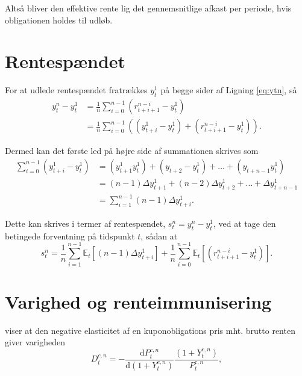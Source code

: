 \documentclass[
  a4paper,
  oneside]{memoir}
\begin{document}
Altså bliver den effektive rente lig det gennemsnitlige afkast per periode, hvis obligationen holdes til udløb.

\hypertarget{rentespuxe6ndet}{%
\section{Rentespændet}\label{rentespuxe6ndet}}

For at udlede rentespændet fratrækkes \(y_t^1\) på begge sider af Ligning \eqref{eq:ytn}, så
\begin{align*}
y_t^n-y_t^1&=\frac{1}{n} \sum_{i=0}^{n-1} \left(r_{t+i+1}^{n-i}-y_t^1\right)\\
&=\frac{1}{n} \sum_{i=0}^{n-1} \left(\left(y_{t+i}^1-y_t^1\right) + \left(r_{t+i+1}^{n-i}-y_t^1\right)\right).
\end{align*}

Dermed kan det første led på højre side af summationen skrives som
\begin{align*}
\sum_{i=0}^{n-1}\left(y_{t+i}^1-y_t^1\right)&=\left(y_{t+1}^1 y_t^1\right) + \left(y_{t+2}-y_t^1\right)+\dots +\left(y_{t+n-1} y_t^1\right)\\
&=\left(n-1\right)\Delta y_{t+1}^1+\left(n-2\right)\Delta y_{t+2}^1 + \dots+ \Delta y_{t+n-1}^1\\
&=\sum_{i=1}^{n-1}  \left(n-1\right)\Delta y_{t+i}^1.
\end{align*}

Dette kan skrives i termer af rentespændet, \(s_t^n=y_t^n-y_t^1\), ved at tage den betingede forventning på tidspunkt \(t\), sådan at
\begin{equation*}
s_t^n=\frac{1}{n} \sum_{i=1}^{n-1} \mathbb{E}_t[\left(n-1\right)\Delta y_{t+i}^1] + \frac{1}{n} \sum_{i=0}^{n-1} \mathbb{E}_t\left[\left(r_{t+i+1}^{n-i} - y_t^1\right)\right].
\end{equation*}

\hypertarget{varighed-og-renteimmunisering}{%
\section{Varighed og renteimmunisering}\label{varighed-og-renteimmunisering}}

\citep{Macaulay1938} viser at den negative elasticitet af en kuponobligations pris mht. brutto renten giver varigheden
\begin{equation*}
D_t^{c,n} = -\frac{\text{d} P_t^{c,n}}{\text{d}\left(1+Y_t^{c,n}\right)}\frac{\left(1+Y_t^{c,n}\right)}{P_t^{c,n}},
\end{equation*}
\end{document}
